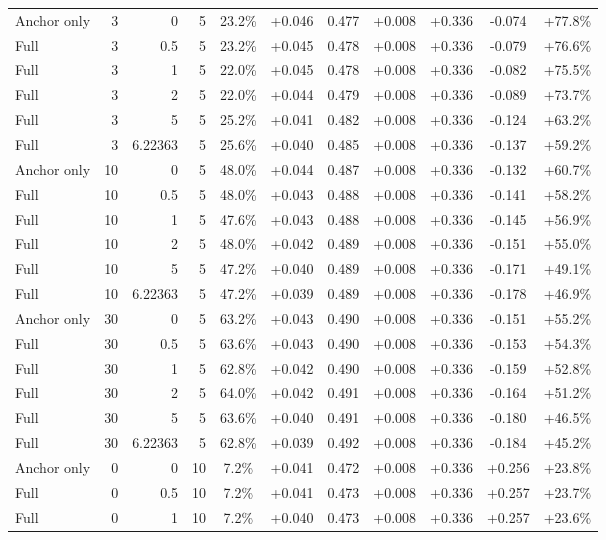 \begin{table}[htbp]
\begin{tabular}{lrrrccccccc}
Anchor only & 3 & 0 & 5 & 23.2\% & +0.046 & 0.477 & +0.008 & +0.336 & -0.074 & +77.8\% \\
Full & 3 & 0.5 & 5 & 23.2\% & +0.045 & 0.478 & +0.008 & +0.336 & -0.079 & +76.6\% \\
Full & 3 & 1 & 5 & 22.0\% & +0.045 & 0.478 & +0.008 & +0.336 & -0.082 & +75.5\% \\
Full & 3 & 2 & 5 & 22.0\% & +0.044 & 0.479 & +0.008 & +0.336 & -0.089 & +73.7\% \\
Full & 3 & 5 & 5 & 25.2\% & +0.041 & 0.482 & +0.008 & +0.336 & -0.124 & +63.2\% \\
Full & 3 & 6.22363 & 5 & 25.6\% & +0.040 & 0.485 & +0.008 & +0.336 & -0.137 & +59.2\% \\
Anchor only & 10 & 0 & 5 & 48.0\% & +0.044 & 0.487 & +0.008 & +0.336 & -0.132 & +60.7\% \\
Full & 10 & 0.5 & 5 & 48.0\% & +0.043 & 0.488 & +0.008 & +0.336 & -0.141 & +58.2\% \\
Full & 10 & 1 & 5 & 47.6\% & +0.043 & 0.488 & +0.008 & +0.336 & -0.145 & +56.9\% \\
Full & 10 & 2 & 5 & 48.0\% & +0.042 & 0.489 & +0.008 & +0.336 & -0.151 & +55.0\% \\
Full & 10 & 5 & 5 & 47.2\% & +0.040 & 0.489 & +0.008 & +0.336 & -0.171 & +49.1\% \\
Full & 10 & 6.22363 & 5 & 47.2\% & +0.039 & 0.489 & +0.008 & +0.336 & -0.178 & +46.9\% \\
Anchor only & 30 & 0 & 5 & 63.2\% & +0.043 & 0.490 & +0.008 & +0.336 & -0.151 & +55.2\% \\
Full & 30 & 0.5 & 5 & 63.6\% & +0.043 & 0.490 & +0.008 & +0.336 & -0.153 & +54.3\% \\
Full & 30 & 1 & 5 & 62.8\% & +0.042 & 0.490 & +0.008 & +0.336 & -0.159 & +52.8\% \\
Full & 30 & 2 & 5 & 64.0\% & +0.042 & 0.491 & +0.008 & +0.336 & -0.164 & +51.2\% \\
Full & 30 & 5 & 5 & 63.6\% & +0.040 & 0.491 & +0.008 & +0.336 & -0.180 & +46.5\% \\
Full & 30 & 6.22363 & 5 & 62.8\% & +0.039 & 0.492 & +0.008 & +0.336 & -0.184 & +45.2\% \\
Anchor only & 0 & 0 & 10 & 7.2\% & +0.041 & 0.472 & +0.008 & +0.336 & +0.256 & +23.8\% \\
Full & 0 & 0.5 & 10 & 7.2\% & +0.041 & 0.473 & +0.008 & +0.336 & +0.257 & +23.7\% \\
Full & 0 & 1 & 10 & 7.2\% & +0.040 & 0.473 & +0.008 & +0.336 & +0.257 & +23.6\% \\

\end{tabular}
\end{table}
